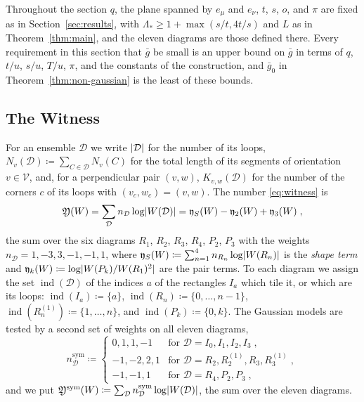 \documentclass[11pt]{preprint}
\DeclarePairedDelimiter{\abs}{\lvert}{\rvert}
\numberwithin{equation}{section}
\theoremstyle{definition}
\theoremstyle{remark}
\theoremstyle{plain}
\begin{document}
Throughout the section $q$, the plane spanned by $e_\mu$ and $e_\nu$, $t$, $s$, $o$, and $\pi$ are fixed as in Section~\ref{sec:results}, with $\Lambda_* \geq 1 + \max(s/t, 4t/s)$ and $L$ as in Theorem~\ref{thm:main}, and the eleven diagrams are those defined there. Every requirement in this section that $\bar g$ be small is an upper bound on $\bar g$ in terms of $q$, $t/u$, $s/u$, $T/u$, $\pi$, and the constants of the construction, and $\bar g_0$ in Theorem~\ref{thm:non-gaussian} is the least of these bounds.

\subsection{The Witness}\label{sec:witness}

For an ensemble $\mathcal D$ we write $\abs{\mathcal D}$ for the number of its loops, $N_v(\mathcal D) \coloneqq \sum_{C \in \mathcal D}N_v(C)$ for the total length of its segments of orientation $v \in \mathcal V$, and, for a perpendicular pair $(v, w)$, $K_{v,w}(\mathcal D)$ for the number of the corners $c$ of its loops with $(v_c, w_c) = (v, w)$. The number \eqref{eq:witness} is
\begin{equation}\label{eq:witness-weights}
    \mathfrak Y(W) = \sum_{\mathcal D}n_{\mathcal D}\log\abs{W(\mathcal D)} = \mathfrak y_S(W) - \mathfrak y_2(W) + \mathfrak y_3(W)\;,
\end{equation}
the sum over the six diagrams $R_1$, $R_2$, $R_3$, $R_4$, $P_2$, $P_3$ with the weights $n_{\mathcal D} = 1, -3, 3, -1, -1, 1$, where $\mathfrak y_S(W) \coloneqq \sum_{n=1}^{4}n_{R_n}\log\abs{W(R_n)}$ is the \emph{shape term} and $\mathfrak y_k(W) \coloneqq \log\abs{W(P_k)/W(R_1)^2}$ are the pair terms. To each diagram we assign the set $\operatorname{ind}(\mathcal D)$ of the indices $a$ of the rectangles $I_a$ which tile it, or which are its loops: $\operatorname{ind}(I_a) \coloneqq \{ a \}$, $\operatorname{ind}(R_n) \coloneqq \{ 0, \dots, n - 1 \}$, $\operatorname{ind}(R^{(1)}_n) \coloneqq \{ 1, \dots, n \}$, and $\operatorname{ind}(P_k) \coloneqq \{ 0, k \}$. The Gaussian models are tested by a second set of weights on all eleven diagrams,
\begin{equation}\label{eq:symmetric-weights}
    n^{\mathrm{sym}}_{\mathcal D} \coloneqq
    \begin{cases}
        0, 1, 1, -1 & \text{for } \mathcal D = I_0, I_1, I_2, I_3\;,\\
        -1, -2, 2, 1 & \text{for } \mathcal D = R_2, R^{(1)}_2, R_3, R^{(1)}_3\;,\\
        -1, -1, 1 & \text{for } \mathcal D = R_4, P_2, P_3\;,
    \end{cases}
\end{equation}
and we put $\mathfrak Y^{\mathrm{sym}}(W) \coloneqq \sum_{\mathcal D}n^{\mathrm{sym}}_{\mathcal D}\log\abs{W(\mathcal D)}$, the sum over the eleven diagrams.
\end{document}
